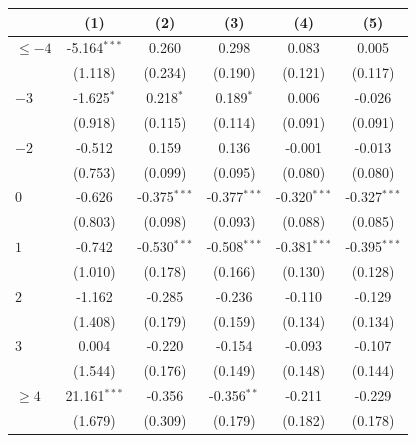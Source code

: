 
\begingroup
\centering
\begin{tabular}{lccccc}
   \toprule
                        & (1)             & (2)            & (3)            & (4)            & (5)\\  
   \midrule 
   $\leq -4$            & -5.164$^{***}$  & 0.260          & 0.298          & 0.083          & 0.005\\   
                        & (1.118)         & (0.234)        & (0.190)        & (0.121)        & (0.117)\\   
   $-3$                 & -1.625$^{*}$    & 0.218$^{*}$    & 0.189$^{*}$    & 0.006          & -0.026\\   
                        & (0.918)         & (0.115)        & (0.114)        & (0.091)        & (0.091)\\   
   $-2$                 & -0.512          & 0.159          & 0.136          & -0.001         & -0.013\\   
                        & (0.753)         & (0.099)        & (0.095)        & (0.080)        & (0.080)\\   
   $0$                  & -0.626          & -0.375$^{***}$ & -0.377$^{***}$ & -0.320$^{***}$ & -0.327$^{***}$\\   
                        & (0.803)         & (0.098)        & (0.093)        & (0.088)        & (0.085)\\   
   $1$                  & -0.742          & -0.530$^{***}$ & -0.508$^{***}$ & -0.381$^{***}$ & -0.395$^{***}$\\   
                        & (1.010)         & (0.178)        & (0.166)        & (0.130)        & (0.128)\\   
   $2$                  & -1.162          & -0.285         & -0.236         & -0.110         & -0.129\\   
                        & (1.408)         & (0.179)        & (0.159)        & (0.134)        & (0.134)\\   
   $3$                  & 0.004           & -0.220         & -0.154         & -0.093         & -0.107\\   
                        & (1.544)         & (0.176)        & (0.149)        & (0.148)        & (0.144)\\   
   $\geq 4$             & 21.161$^{***}$  & -0.356         & -0.356$^{**}$  & -0.211         & -0.229\\   
                        & (1.679)         & (0.309)        & (0.179)        & (0.182)        & (0.178)\\   

\end{tabular}
